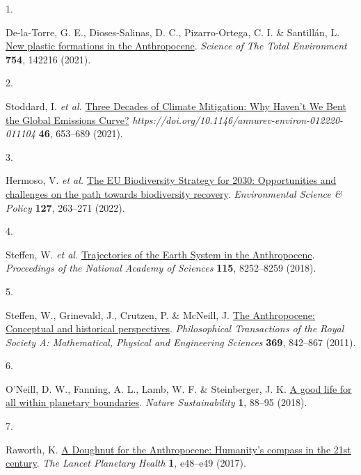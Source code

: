 \documentclass[
  11pt,
  a4paperpaper,
  onecolumn]{article}
\newlength{\cslhangindent}
\newlength{\csllabelwidth}
\newenvironment{CSLReferences}[2] %
 {\begin{list}{}{%
  \setlength{\itemindent}{0pt}
  \setlength{\leftmargin}{0pt}
  \setlength{\parsep}{0pt}
  \ifodd #1
   \setlength{\leftmargin}{\cslhangindent}
   \setlength{\itemindent}{-1\cslhangindent}
  \fi
  \setlength{\itemsep}{#2\baselineskip}}}
 {\end{list}}
\newcommand{\CSLLeftMargin}[1]{\parbox[t]{\csllabelwidth}{\strut#1\strut}}
\newcommand{\CSLRightInline}[1]{\parbox[t]{\linewidth - \csllabelwidth}{\strut#1\strut}}
\begin{document}
\label{refs}
\begin{CSLReferences}{0}{0}
\CSLLeftMargin{1. }%
\CSLRightInline{De-la-Torre, G. E., Dioses-Salinas, D. C.,
Pizarro-Ortega, C. I. \& Santillán, L.
\href{https://doi.org/10.1016/j.scitotenv.2020.142216}{New plastic
formations in the {Anthropocene}}. \emph{Science of The Total
Environment} \textbf{754}, 142216 (2021).}

\CSLLeftMargin{2. }%
\CSLRightInline{Stoddard, I. \emph{et al.}
\href{https://doi.org/10.1146/ANNUREV-ENVIRON-012220-011104}{Three
{Decades} of {Climate Mitigation}: {Why Haven}'t {We Bent} the {Global
Emissions Curve}?}
\emph{https://doi.org/10.1146/annurev-environ-012220-011104}
\textbf{46}, 653--689 (2021).}

\CSLLeftMargin{3. }%
\CSLRightInline{Hermoso, V. \emph{et al.}
\href{https://doi.org/10.1016/J.ENVSCI.2021.10.028}{The {EU Biodiversity
Strategy} for 2030: {Opportunities} and challenges on the path towards
biodiversity recovery}. \emph{Environmental Science \& Policy}
\textbf{127}, 263--271 (2022).}

\CSLLeftMargin{4. }%
\CSLRightInline{Steffen, W. \emph{et al.}
\href{https://doi.org/10.1073/pnas.1810141115}{Trajectories of the
{Earth System} in the {Anthropocene}}. \emph{Proceedings of the National
Academy of Sciences} \textbf{115}, 8252--8259 (2018).}

\CSLLeftMargin{5. }%
\CSLRightInline{Steffen, W., Grinevald, J., Crutzen, P. \& McNeill, J.
\href{https://doi.org/10.1098/rsta.2010.0327}{The {Anthropocene}:
Conceptual and historical perspectives}. \emph{Philosophical
Transactions of the Royal Society A: Mathematical, Physical and
Engineering Sciences} \textbf{369}, 842--867 (2011).}

\CSLLeftMargin{6. }%
\CSLRightInline{O'Neill, D. W., Fanning, A. L., Lamb, W. F. \&
Steinberger, J. K. \href{https://doi.org/10.1038/s41893-018-0021-4}{A
good life for all within planetary boundaries}. \emph{Nature
Sustainability} \textbf{1}, 88--95 (2018).}

\CSLLeftMargin{7. }%
\CSLRightInline{Raworth, K.
\href{https://doi.org/10.1016/S2542-5196(17)30028-1}{A {Doughnut} for
the {Anthropocene}: Humanity's compass in the 21st century}. \emph{The
Lancet Planetary Health} \textbf{1}, e48--e49 (2017).}


\end{CSLReferences}
\end{document}
